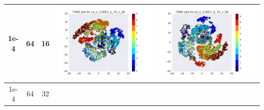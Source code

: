 \documentclass[12pt]{report}
\begin{document}
\begin{table}[H]
\begin{tabular}{ | c | c | c | c || c |}
        \\ \hline
    1e-4 & 64 & 16 &
    \begin{minipage}{.3\textwidth}
      \includegraphics[scale=0.25]{cd_lr_0_0001_k_16_n_64.png}
    \end{minipage} &
    \begin{minipage}{.3\textwidth}
      \includegraphics[scale=0.25]{test_cd_lr_0_0001_k_16_n_64.png}
    \end{minipage}
        \\ \hline
    1e-4 & 64 & 32 &
    \begin{minipage}{.3\textwidth}

\end{minipage}
\end{tabular}
\end{table}
\end{document}
